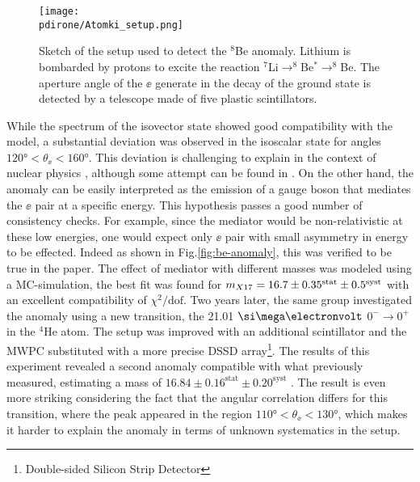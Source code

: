 \begin{figure}[htb!]
  \centering
  \texttt{[image: \\pdirone/Atomki\_setup.png]}
  \caption[Sketch of the setup used to detect the $^8$Be anomaly.]{Sketch of the setup used to detect the $^8$Be anomaly. Lithium is bombarded by protons to excite the reaction $^7$Li$\to ^8$Be$^* \to ^8$Be. The aperture angle of the $\ee$ generate in the decay of the ground state is detected by a telescope made of five plastic scintillators. \cite{PhysRevD.95.035017}}
  \label{fig:x17-setup}
\end{figure}

While the spectrum of the isovector state showed good compatibility with the model, a substantial deviation was observed in the isoscalar state for angles $120 \si{\degree} < \theta_{\ee} < 160 \si{\degree}$. This deviation is challenging to explain in the context of nuclear physics \cite{Krasznahorkay:2015iga}, although some attempt can be found in \cite{Zhang:2017zap,Koch:2020ouk}. On the other hand, the anomaly can be easily interpreted as the emission of a gauge boson that mediates the $\ee$ pair at a specific energy. This hypothesis passes a good number of consistency checks. For example, since the mediator would be non-relativistic at these low energies, one would expect only $\ee$ pair with small asymmetry in energy to be effected. Indeed as shown in Fig.\ref{fig:be-anomaly}, this was verified to be true in the paper. The effect of mediator with different masses was modeled using a MC-simulation, the best fit was found for $m_{X17} = 16.7 \pm 0.35^{\textrm{stat}} \pm 0.5^{\textrm{syst}}$ with an excellent compatibility of $\chi^2/\textrm{dof}$. Two years later, the same group investigated the anomaly using a new transition, the 21.01 $\mev$ $0^- \to 0^+$ in the $^4$He atom. The setup was improved with an additional scintillator and the MWPC substituted with a more precise  DSSD array\footnote{Double-sided Silicon Strip Detector}. The results of this experiment revealed a second anomaly compatible with what previously measured, estimating a mass of $16.84 \pm 0.16^{\textrm{stat}} \pm 0.20^{\textrm{syst}}$ \cite{Krasznahorkay:2019lyl}. The result is even more striking considering the fact that the angular correlation differs for this transition, where the peak appeared in the region $110 \si{\degree} < \theta_{\ee} < 130 \si{\degree}$, which makes it harder to explain the anomaly in terms of unknown systematics in the setup.

